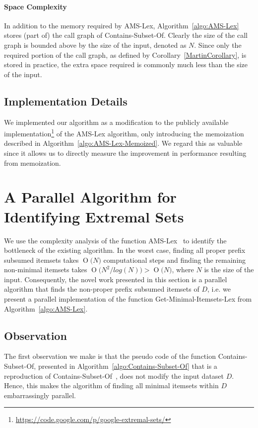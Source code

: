 \documentclass[13pt,a4paper]{article}
\newcommand{\BigO}[1]{\ensuremath{\operatorname{O}\bigl(#1\bigr)}}
\begin{document}
\paragraph{Space Complexity}
In addition to the memory required by AMS-Lex, Algorithm~\ref{algo:AMS-Lex} stores (part of) the call graph of Contains-Subset-Of. Clearly the size of the call graph is bounded above by the size of the input, denoted as $N$. Since only the required portion of the call graph, as defined by Corollary~\ref{MartinCorollary}, is stored in practice, the extra space required is commonly much less than the size of the input.

\subsection{Implementation Details}
\label{ImplDetails}
We implemented our algorithm as a modification to the publicly available implementation\footnote{\url{https://code.google.com/p/google-extremal-sets/}} of the AMS-Lex algorithm, only introducing
the memoization described in Algorithm~\ref{algo:AMS-Lex-Memoized}. We regard this as valuable since it allows us to directly measure the improvement in performance resulting from memoization.


\section{A Parallel Algorithm for Identifying Extremal Sets}
\label{sec:parallel}

We use the complexity analysis of the function AMS-Lex~\cite{BayardoPanda11} to identify the bottleneck of the existing algorithm. In the worst case, finding all proper prefix subsumed itemsets takes $ \BigO{ N } $ computational steps and finding the remaining non-minimal itemsets takes $ \BigO{ N^2 / log(N) } > \BigO{ N }$, where $N$ is the size of the input. Consequently, the novel work presented in this section is a parallel algorithm that finds the non-proper prefix subsumed itemsets of $D$, i.e. we present a parallel implementation of the function Get-Minimal-Itemsets-Lex from Algorithm~\ref{algo:AMS-Lex}.

\subsection{Observation}
The first observation we make is that the pseudo code of the function Contains-Subset-Of, presented in Algorithm~\ref{algo:Contains-Subset-Of} that is a reproduction of Contains-Subset-Of~\cite{BayardoPanda11}, does not modify the input dataset $D$. Hence, this makes the algorithm of finding all minimal itemsets within $D$ embarrassingly parallel.
\end{document}
